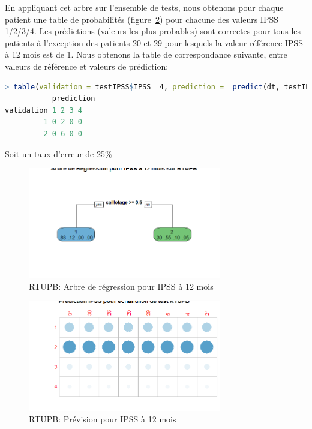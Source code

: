 En appliquant cet arbre sur l'ensemble de tests, nous obtenons pour chaque patient une table de probabilités (figure~\ref{fig-rtupb-regtree-predict-ipss12}) pour chacune des valeurs IPSS 1/2/3/4. Les prédictions (valeurs
les plus probables) sont correctes pour tous les patients à l'exception des patients 20 et 29 pour lesquels la valeur référence IPSS à 12 mois est de 1.
Nous obtenons la table de correspondance suivante, entre valeurs de référence et valeurs de prédiction:

\begin{lstlisting}[language=R]
> table(validation = testIPSS$IPSS__4, prediction =  predict(dt, testIPSS, type="class"))
           prediction
validation 1 2 3 4
         1 0 2 0 0
         2 0 6 0 0
\end{lstlisting}
Soit un taux d'erreur de 25\%

\begin{figure}[H]
\centering
\includegraphics[width=0.75\textwidth]{../Fig/RTUPB/rtupb-regtree-ipss12.png}
\caption{RTUPB: Arbre de régression pour IPSS à 12 mois}
\label{fig-rtupb-regtree-ipss12}
\end{figure}


\begin{figure}[H]
\centering
\includegraphics[width=0.75\textwidth]{../Fig/RTUPB/rtupb-regtree-predict-ipss12.png}
\caption{RTUPB: Prévision pour IPSS à 12 mois}
\label{fig-rtupb-regtree-predict-ipss12}
\end{figure}

